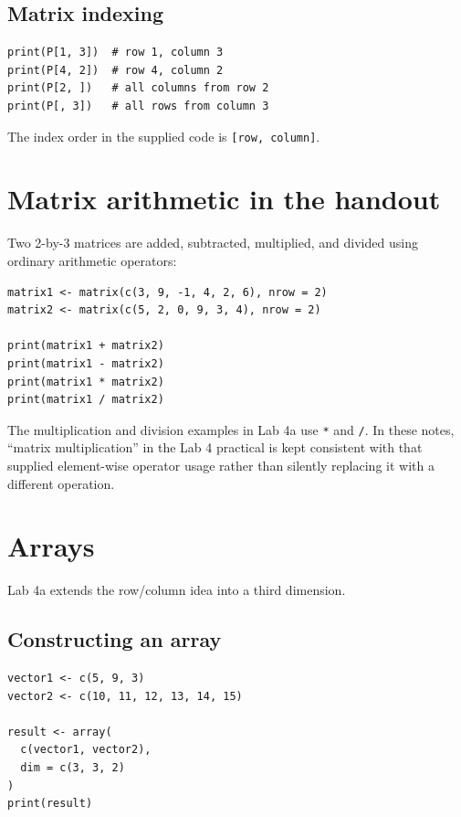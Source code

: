 \subsection{Matrix indexing}

\begin{lstlisting}[style=dsr]
print(P[1, 3])  # row 1, column 3
print(P[4, 2])  # row 4, column 2
print(P[2, ])   # all columns from row 2
print(P[, 3])   # all rows from column 3
\end{lstlisting}

The index order in the supplied code is \texttt{[row, column]}.

\section{Matrix arithmetic in the handout}

Two 2-by-3 matrices are added, subtracted, multiplied, and divided using ordinary arithmetic operators:

\begin{lstlisting}[style=dsr]
matrix1 <- matrix(c(3, 9, -1, 4, 2, 6), nrow = 2)
matrix2 <- matrix(c(5, 2, 0, 9, 3, 4), nrow = 2)

print(matrix1 + matrix2)
print(matrix1 - matrix2)
print(matrix1 * matrix2)
print(matrix1 / matrix2)
\end{lstlisting}

\begin{keyidea}
The multiplication and division examples in Lab 4a use \texttt{*} and \texttt{/}. In these notes, ``matrix multiplication'' in the Lab 4 practical is kept consistent with that supplied element-wise operator usage rather than silently replacing it with a different operation.
\end{keyidea}

\section{Arrays}

Lab 4a extends the row/column idea into a third dimension.

\subsection{Constructing an array}

\begin{lstlisting}[style=dsr]
vector1 <- c(5, 9, 3)
vector2 <- c(10, 11, 12, 13, 14, 15)

result <- array(
  c(vector1, vector2),
  dim = c(3, 3, 2)
)
print(result)
\end{lstlisting}

